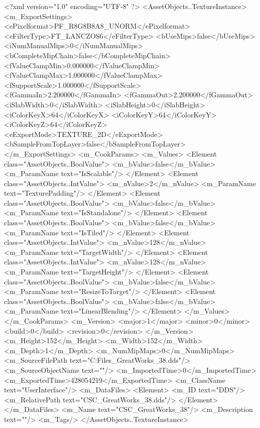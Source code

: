 <?xml version="1.0" encoding="UTF-8" ?>
<AssetObjects..TextureInstance>
	<m_ExportSettings>
		<ePixelformat>PF_R8G8B8A8_UNORM</ePixelformat>
		<eFilterType>FT_LANCZOS6</eFilterType>
		<bUseMips>false</bUseMips>
		<iNumManualMips>0</iNumManualMips>
		<bCompleteMipChain>false</bCompleteMipChain>
		<fValueClampMin>0.000000</fValueClampMin>
		<fValueClampMax>1.000000</fValueClampMax>
		<fSupportScale>1.000000</fSupportScale>
		<fGammaIn>2.200000</fGammaIn>
		<fGammaOut>2.200000</fGammaOut>
		<iSlabWidth>0</iSlabWidth>
		<iSlabHeight>0</iSlabHeight>
		<iColorKeyX>64</iColorKeyX>
		<iColorKeyY>64</iColorKeyY>
		<iColorKeyZ>64</iColorKeyZ>
		<eExportMode>TEXTURE_2D</eExportMode>
		<bSampleFromTopLayer>false</bSampleFromTopLayer>
	</m_ExportSettings>
	<m_CookParams>
		<m_Values>
			<Element class="AssetObjects..BoolValue">
				<m_bValue>false</m_bValue>
				<m_ParamName text="IsScalable"/>
			</Element>
			<Element class="AssetObjects..IntValue">
				<m_nValue>2</m_nValue>
				<m_ParamName text="TexturePadding"/>
			</Element>
			<Element class="AssetObjects..BoolValue">
				<m_bValue>false</m_bValue>
				<m_ParamName text="IsStandalone"/>
			</Element>
			<Element class="AssetObjects..BoolValue">
				<m_bValue>false</m_bValue>
				<m_ParamName text="IsTiled"/>
			</Element>
			<Element class="AssetObjects..IntValue">
				<m_nValue>128</m_nValue>
				<m_ParamName text="TargetWidth"/>
			</Element>
			<Element class="AssetObjects..IntValue">
				<m_nValue>128</m_nValue>
				<m_ParamName text="TargetHeight"/>
			</Element>
			<Element class="AssetObjects..BoolValue">
				<m_bValue>false</m_bValue>
				<m_ParamName text="ResizeToTarget"/>
			</Element>
			<Element class="AssetObjects..BoolValue">
				<m_bValue>false</m_bValue>
				<m_ParamName text="LinearBlending"/>
			</Element>
		</m_Values>
	</m_CookParams>
	<m_Version>
		<major>1</major>
		<minor>0</minor>
		<build>0</build>
		<revision>0</revision>
	</m_Version>
	<m_Height>152</m_Height>
	<m_Width>152</m_Width>
	<m_Depth>1</m_Depth>
	<m_NumMipMaps>0</m_NumMipMaps>
	<m_SourceFilePath text="C:\Users\Shadow\Desktop\Working Files\Icons\GreatWorks\CSC_GreatWorks_38.dds"/>
	<m_SourceObjectName text=""/>
	<m_ImportedTime>0</m_ImportedTime>
	<m_ExportedTime>428054219</m_ExportedTime>
	<m_ClassName text="UserInterface"/>
	<m_DataFiles>
		<Element>
			<m_ID text="DDS"/>
			<m_RelativePath text="CSC_GreatWorks_38.dds"/>
		</Element>
	</m_DataFiles>
	<m_Name text="CSC_GreatWorks_38"/>
	<m_Description text=""/>
	<m_Tags/>
</AssetObjects..TextureInstance>

